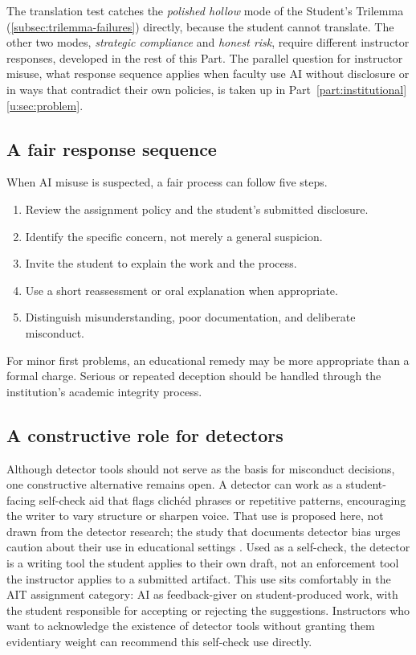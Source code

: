 \documentclass{SIAMbook2023}
\begin{document}
The translation test catches the \emph{polished hollow} mode of the Student's Trilemma (\cref{subsec:trilemma-failures}) directly, because the student cannot translate. The other two modes, \emph{strategic compliance} and \emph{honest risk}, require different instructor responses, developed in the rest of this Part. The parallel question for instructor misuse, what response sequence applies when faculty use AI without disclosure or in ways that contradict their own policies, is taken up in Part~\ref{part:institutional} \cref{u:sec:problem}.

\subsection{A fair response sequence}
\label{i:subsec:fair-response}

When AI misuse is suspected, a fair process can follow five steps.

\begin{enumerate}
\item Review the assignment policy and the student's submitted disclosure.
\item Identify the specific concern, not merely a general suspicion.
\item Invite the student to explain the work and the process.
\item Use a short reassessment or oral explanation when appropriate.
\item Distinguish misunderstanding, poor documentation, and deliberate misconduct.
\end{enumerate}

For minor first problems, an educational remedy may be more appropriate than a formal charge. Serious or repeated deception should be handled through the institution's academic integrity process.

\subsection{A constructive role for detectors}
\label{i:subsec:detector-self-check}%

Although detector tools should not serve as the basis for misconduct decisions, one constructive alternative remains open. A detector can work as a student-facing self-check aid that flags clichéd phrases or repetitive patterns, encouraging the writer to vary structure or sharpen voice. That use is proposed here, not drawn from the detector research; the study that documents detector bias urges caution about their use in educational settings \citep{liang2023gpt}. Used as a self-check, the detector is a writing tool the student applies to their own draft, not an enforcement tool the instructor applies to a submitted artifact. This use sits comfortably in the AIT assignment category: AI as feedback-giver on student-produced work, with the student responsible for accepting or rejecting the suggestions. Instructors who want to acknowledge the existence of detector tools without granting them evidentiary weight can recommend this self-check use directly.
\end{document}
